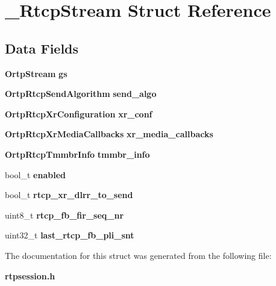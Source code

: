 \section{\+\_\+\+Rtcp\+Stream Struct Reference}
\label{struct__RtcpStream}
\subsection*{Data Fields}
\begin{DoxyCompactItemize}
\item 
\mbox{\label{struct__RtcpStream_a571b548a9032e46d880bdcbec0fa101a}} 
\textbf{ Ortp\+Stream} {\bfseries gs}
\item 
\mbox{\label{struct__RtcpStream_a8ffa2cc66a6bb8301170c40a4ed3a2e9}} 
\textbf{ Ortp\+Rtcp\+Send\+Algorithm} {\bfseries send\+\_\+algo}
\item 
\mbox{\label{struct__RtcpStream_aa35b8f0c08b9968488f4357836c9e9cd}} 
\textbf{ Ortp\+Rtcp\+Xr\+Configuration} {\bfseries xr\+\_\+conf}
\item 
\mbox{\label{struct__RtcpStream_a42b5aeb04c21f5aa3059dc7a30c5c382}} 
\textbf{ Ortp\+Rtcp\+Xr\+Media\+Callbacks} {\bfseries xr\+\_\+media\+\_\+callbacks}
\item 
\mbox{\label{struct__RtcpStream_ad0b24dcb1106b713a8476d224eea6c31}} 
\textbf{ Ortp\+Rtcp\+Tmmbr\+Info} {\bfseries tmmbr\+\_\+info}
\item 
\mbox{\label{struct__RtcpStream_a095cc9461f453dba38c2555ce6c54b45}} 
bool\+\_\+t {\bfseries enabled}
\item 
\mbox{\label{struct__RtcpStream_a2c8f3881d88acc0d13b39dad04e56267}} 
bool\+\_\+t {\bfseries rtcp\+\_\+xr\+\_\+dlrr\+\_\+to\+\_\+send}
\item 
\mbox{\label{struct__RtcpStream_af9e1968c837f10e293e092098650ffaf}} 
uint8\+\_\+t {\bfseries rtcp\+\_\+fb\+\_\+fir\+\_\+seq\+\_\+nr}
\item 
\mbox{\label{struct__RtcpStream_a957a6224c8c2e5edccecd79d82ad2146}} 
uint32\+\_\+t {\bfseries last\+\_\+rtcp\+\_\+fb\+\_\+pli\+\_\+snt}
\end{DoxyCompactItemize}


The documentation for this struct was generated from the following file\+:\begin{DoxyCompactItemize}
\item 
\textbf{ rtpsession.\+h}\end{DoxyCompactItemize}
